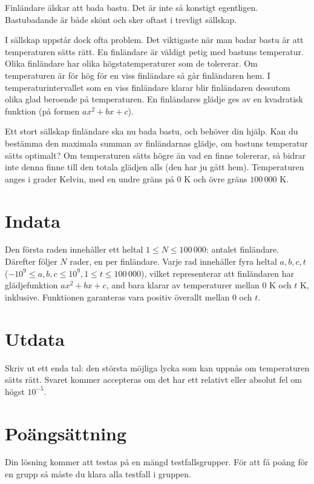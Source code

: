 Finländare älskar att bada bastu. Det är inte så konstigt egentligen.
Bastubadande är både skönt och sker oftast i trevligt sällskap.

I sällskap uppstår dock ofta problem. Det viktigaste när man badar bastu är att temperaturen sätts rätt.
En finländare är väldigt petig med bastuns temperatur.
Olika finländare har olika högstatemperaturer som de tolererar.
Om temperaturen är för hög för en viss finländare så går finländaren hem.
I temperaturintervallet som en viss finländare klarar blir finländaren dessutom olika glad beroende på temperaturen.
En finländares glädje ges av en kvadratisk funktion (på formen $ax^2 + bx + c$).

Ett stort sällskap finländare ska nu bada bastu, och behöver din hjälp.
Kan du bestämma den maximala summan av finländarnas glädje, om bastuns temperatur sätts optimalt?
Om temperaturen sätts högre än vad en finne tolererar, så bidrar inte denna finne till den totala glädjen alls (den har ju gått hem).
Temperaturen anges i grader Kelvin, med en undre gräns på $0 \textrm{ K}$ och övre gräns $100\,000 \textrm{ K}$.

\section*{Indata}
Den första raden innehåller ett heltal $1 \le N \le 100\,000$: antalet finländare.
Därefter följer $N$ rader, en per finländare.
Varje rad innehåller fyra heltal $a, b, c, t$ ($-10^9 \le a,b,c \le 10^9, 1 \le t \le 100\,000$), vilket representerar att finländaren har glädjefunktion $ax^2 + bx + c$, and bara klarar av temperaturer mellan $0\textrm{ K}$ och $t\textrm{ K}$, inklusive.
Funktionen garanteras vara positiv överallt mellan $0$ och $t$.

\section*{Utdata}
Skriv ut ett enda tal: den största möjliga lycka som kan uppnås om temperaturen sätts rätt.
Svaret kommer accepteras om det har ett relativt eller absolut fel om högst $10^{-5}$.


\section*{Poängsättning}
Din lösning kommer att testas på en mängd testfallsgrupper. För att få poäng för en grupp
så måste du klara alla testfall i gruppen.

